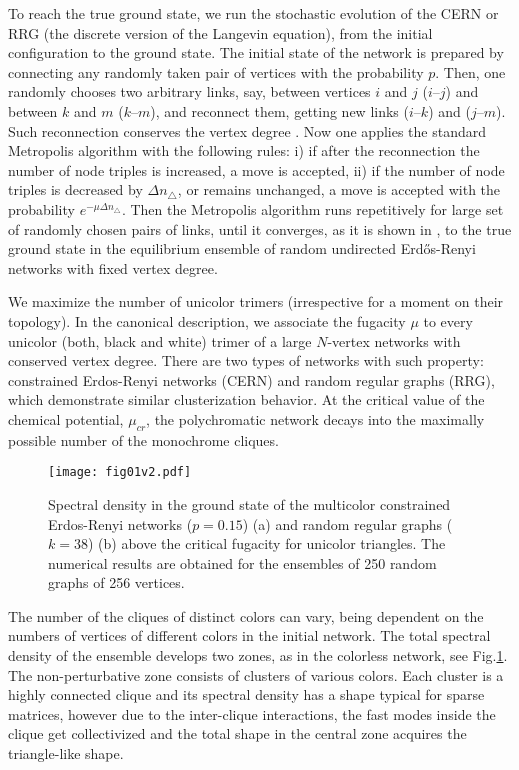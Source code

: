 \documentclass[aps,12pt]{revtex4}
\newcommand{\fig}[1]{Fig.\ref{#1}}
\begin{document}
To reach the true ground state, we run the stochastic evolution of the CERN or RRG (the discrete version of the Langevin equation), from the initial configuration to the ground state. The initial state of the network is prepared by connecting any randomly taken pair of vertices with the probability $p$. Then, one randomly chooses two arbitrary links, say, between vertices $i$ and $j$ ($i$--$j$) and between $k$ and $m$ ($k$--$m$), and reconnect them, getting new links ($i$--$k$) and ($j$--$m$). Such reconnection conserves the vertex degree \cite{maslov}. Now one applies the standard Metropolis algorithm with the following rules: i) if after the reconnection the number of node triples is increased, a move is accepted, ii) if the number of node triples is decreased by $\Delta n_{\triangle}$, or remains unchanged, a move is accepted with the probability $e^{-\mu \Delta n_{\triangle}}$. Then the Metropolis algorithm runs repetitively for large set of randomly chosen pairs of links, until it converges, as it is shown in \cite{algor}, to the true ground state in the equilibrium ensemble of random undirected Erd\H{o}s-Renyi networks with fixed vertex degree.

We maximize the number of unicolor trimers (irrespective for a moment on their topology). In the canonical description, we associate the fugacity $\mu$ to every unicolor (both, black and white) trimer of a large $N$-vertex networks with conserved vertex degree. There are two types of networks with such property: constrained Erdos-Renyi networks (CERN) and random regular graphs (RRG), which demonstrate similar clusterization behavior. At the critical value of the chemical potential, $\mu_{cr}$, the polychromatic network decays into the maximally possible number of the monochrome cliques.

\begin{figure}[ht]
\centerline{\texttt{[image: fig01v2.pdf]}}
\caption{Spectral density in the ground state of the multicolor constrained Erdos-Renyi networks ($p=0.15$) (a) and random regular graphs ($k=38$) (b) above the critical fugacity for unicolor triangles. The numerical results are obtained for the ensembles of 250 random graphs of 256 vertices.}
\label{fig:01}
\end{figure}

The number of the cliques of distinct colors can vary, being dependent on the numbers of vertices of different colors in the initial network. The total spectral density of the ensemble develops two zones, as in the colorless network, see \fig{fig:01}. The non-perturbative zone consists of clusters of various colors. Each cluster is a highly connected clique and its spectral density has a shape typical for sparse matrices, however due to the inter-clique interactions, the fast modes inside the clique get collectivized and the total shape in the central zone acquires the triangle-like shape.
\end{document}
